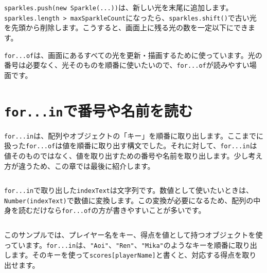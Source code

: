 \begin{listing}[htbp]
\inputminted[firstline=37,lastline=73]{ts}{typescript-p5/listings/chapter18-iteration/click-sparkles.ts}
\caption{\texttt{push}と\texttt{shift}で光のリストを管理する（\texttt{chapter18-iteration/click-sparkles.ts}）}
\label{lst:chapter18-iteration-sparkle-sketch}
\end{listing}

\texttt{sparkles.push(new Sparkle(...))}は、新しい光を末尾に追加します。\texttt{sparkles.length > maxSparkleCount}になったら、\texttt{sparkles.shift()}で古い光を先頭から削除します。こうすると、画面上に残る光の数を一定以下にできます。

\texttt{for...of}は、画面にあるすべての光を更新・描画するために使っています。光の番号は必要なく、光そのものを順番に使いたいので、\texttt{for...of}が読みやすい場面です。

\section{\texttt{for...in}で番号や名前を読む}

\texttt{for...in}は、配列やオブジェクトの「キー」を順番に取り出します。ここまでに扱った\texttt{for...of}は値を順番に取り出す構文でした。それに対して、\texttt{for...in}は値そのものではなく、値を取り出すための番号や名前を取り出します。少し考え方が違うため、この章では最後に紹介します。

\begin{listing}[htbp]
\inputminted{ts}{typescript-p5/listings/chapter18-iteration/for-in-array.ts}
\caption{\texttt{for...in}で配列の番号を取り出す（\texttt{chapter18-iteration/for-in-array.ts}）}
\label{lst:chapter18-iteration-for-in-array}
\end{listing}

\texttt{for...in}で取り出した\texttt{indexText}は文字列です。数値として使いたいときは、\texttt{Number(indexText)}で数値に変換します。この変換が必要になるため、配列の中身を読むだけなら\texttt{for...of}の方が書きやすいことが多いです。

\begin{listing}[htbp]
\inputminted{ts}{typescript-p5/listings/chapter18-iteration/for-in-object.ts}
\caption{\texttt{for...in}で得点表の名前を取り出す（\texttt{chapter18-iteration/for-in-object.ts}）}
\label{lst:chapter18-iteration-for-in-object}
\end{listing}

このサンプルでは、プレイヤー名をキー、得点を値として持つオブジェクトを使っています。\texttt{for...in}は、\texttt{"Aoi"}、\texttt{"Ren"}、\texttt{"Mika"}のようなキーを順番に取り出します。そのキーを使って\texttt{scores[playerName]}と書くと、対応する得点を取り出せます。

